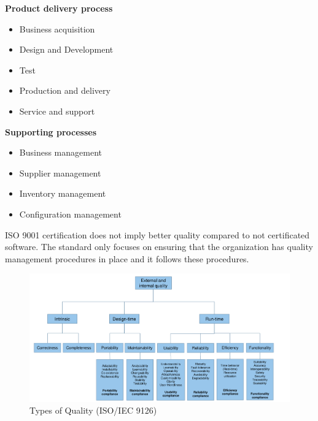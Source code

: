 \begin{minipage}[t]{0.49\textwidth}
    \textbf{Product delivery process}
    \begin{itemize}[topsep=0pt, itemsep=0pt]
        \item Business acquisition
        \item Design and Development
        \item Test
        \item Production and delivery
        \item Service and support
    \end{itemize}
\end{minipage}
\begin{minipage}[t]{0.49\textwidth}
    \textbf{Supporting processes}
    \begin{itemize}[topsep=0pt, itemsep=0pt]
        \item Business management
        \item Supplier management
        \item Inventory management
        \item Configuration management
    \end{itemize}
\end{minipage}
\newline

ISO 9001 certification does not imply better quality compared to not certificated software.
The standard only focuses on ensuring that the organization has quality management procedures in place and it follows these procedures.

\begin{figure}[h]
    \centering
    \includegraphics[width=\linewidth]{images/types_of_quality.png}
    \caption{Types of Quality (ISO/IEC 9126)}\label{fig:se_types_of_quality}
\end{figure}
